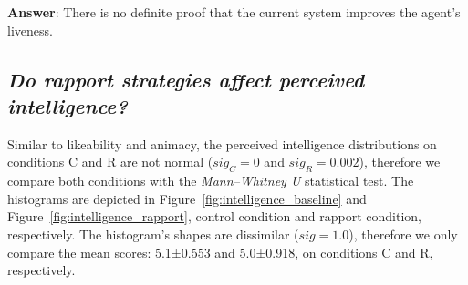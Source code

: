\textbf{Answer}: There is no definite proof that the current system improves the agent's liveness.

\subsection*{\textit{Do rapport strategies affect perceived intelligence?}}

Similar to likeability and animacy, the perceived intelligence distributions on  conditions C and R are not normal ($sig_C=0$ and $sig_R=0.002$), therefore we compare both conditions with the \textit{Mann–Whitney U} statistical test. The histograms are depicted in Figure~\ref{fig:intelligence_baseline} and Figure~\ref{fig:intelligence_rapport}, control condition and rapport condition, respectively. The histogram's shapes are dissimilar ($sig=1.0$), therefore we only compare the mean scores: 5.1±0.553 and 5.0±0.918, on conditions C and R, respectively.


